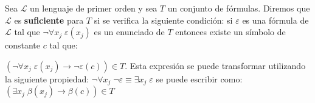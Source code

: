\begin{definition}
Sea $\mathcal{L}$ un lenguaje de primer orden y sea $T$ un conjunto de f\'ormulas. Diremos que $\mathcal{L}$ es \textbf{suficiente} para $T$ si se verifica la siguiente condici\'on: si $\varepsilon$ es una f\'ormula de $\mathcal{L}$ tal que $\neg \forall x_j \; \varepsilon(x_j)$ es un enunciado de $T$ entonces existe un s\'imbolo de constante $c$ tal que:

$(\neg \forall x_j \; \varepsilon(x_j) \rightarrow \neg \varepsilon(c)) \in T$. Esta expresi\'on se puede transformar utilizando la siguiente propiedad: $\neg \forall x_j \; \neg \varepsilon \equiv \exists x_j \; \varepsilon$ se puede escribir como: $(\exists x_j \; \beta(x_j) \rightarrow \beta(c))\in T$
\end{definition}